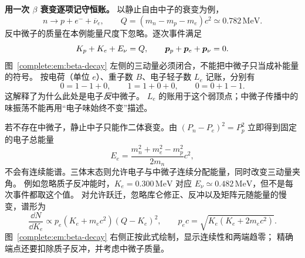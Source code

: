 \noindent\textbf{用一次 $\beta$ 衰变逐项记守恒账。}
以静止自由中子的衰变为例，
\[
 n\longrightarrow p+e^-+\overline\nu_e,\qquad
 Q=(m_n-m_p-m_e)c^2\simeq0.782\,\mathrm{MeV}.
\]
反中微子的质量在本例能量尺度下忽略。逐次事件满足
\[
 K_p+K_e+E_\nu=Q,\qquad
 \bm{p}_p+\bm{p}_e+\bm{p}_\nu=0.
\]
图~\ref{complete:em:beta-decay} 左侧的三动量必须闭合，不能把中微子只当成补能量的符号。
按电荷（单位 $e$）、重子数 $B$、电子轻子数 $L_e$ 记账，分别有
\[
 0=1-1+0,\qquad 1=1+0+0,\qquad 0=0+1-1.
\]
这解释了为什么此处是电子\emph{反}中微子。
$L_e$ 的账用于这个弱顶点；中微子传播中的味振荡不能再用“电子味始终不变”描述。

\begin{qualityfigure}
\end{qualityfigure}

若不存在中微子，静止中子只能作二体衰变。由
$(P_n-P_e)^2=P_p^2$ 立即得到固定的电子总能量
\[
 E_e=\frac{m_n^2+m_e^2-m_p^2}{2m_n}c^2,
\]
不会有连续能谱。三体末态则允许电子与中微子连续分配能量，同时改变三动量夹角。
例如忽略质子反冲能时，$K_e=0.300\,\mathrm{MeV}$ 对应
$E_\nu\simeq0.482\,\mathrm{MeV}$，但不是每次事件都取这个值。
对允许跃迁，忽略库仑修正、反冲以及矩阵元随能量的慢变，谱形为
\[
 \frac{\dd N}{\dd K_e}\propto
 p_e(K_e+m_ec^2)(Q-K_e)^2,
 \qquad p_ec=\sqrt{K_e(K_e+2m_ec^2)}.
\]
图~\ref{complete:em:beta-decay} 右侧正按此式绘制，显示连续性和两端趋零；
精确端点还要扣除质子反冲，并考虑中微子质量。

